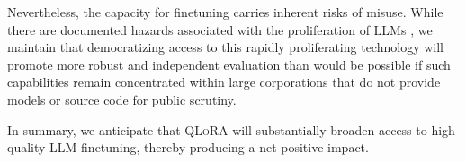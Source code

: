 Nevertheless, the capacity for finetuning carries inherent risks of misuse. While there are documented hazards associated with the proliferation of LLMs \citep{bommasani2021opportunities,bender2021dangers}, we maintain that democratizing access to this rapidly proliferating technology will promote more robust and independent evaluation than would be possible if such capabilities remain concentrated within large corporations that do not provide models or source code for public scrutiny.

In summary, we anticipate that \textsc{QLoRA} will substantially broaden access to high-quality LLM finetuning, thereby producing a net positive impact.